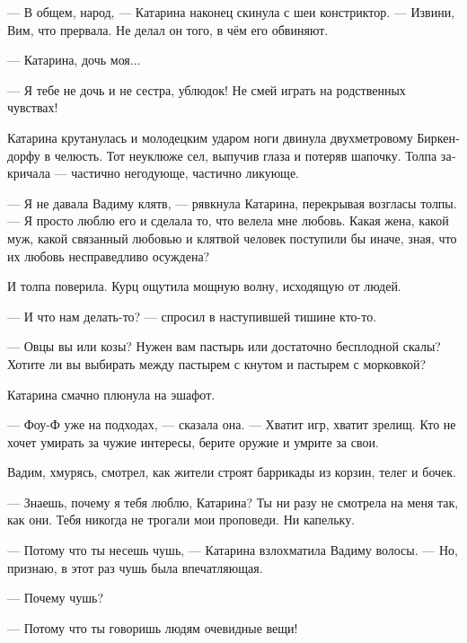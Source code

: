\documentclass[a4paper,12pt,fleqn]{book}\usepackage{polyglossia}\setdefaultlanguage[babelshorthands=true]{russian}\setotherlanguage{english}\defaultfontfeatures{Ligatures=TeX,Mapping=tex-text}\usepackage{xcolor}\newcommand{\ml}[3]{#2}
\newcommand{\textspace}{\vspace{1em}{\centering\Large\bfseries<...>\par}\vspace{1em}}
\begin{document}
--- В общем, народ, --- Катарина наконец скинула с шеи констриктор.
--- Извини, Вим, что прервала.
Не делал он того, в чём его обвиняют.

--- Катарина, дочь моя...

--- Я тебе не дочь и не сестра, ублюдок!
Не смей играть на родственных чувствах!

Катарина крутанулась и молодецким ударом ноги двинула двухметровому Биркендорфу в челюсть.
Тот неуклюже сел, выпучив глаза и потеряв шапочку.
Толпа закричала --- частично негодующе, частично ликующе.

--- Я не давала Вадиму клятв, --- рявкнула Катарина, перекрывая возгласы толпы.
--- Я просто люблю его и сделала то, что велела мне любовь.
Какая жена, какой муж, какой связанный любовью и клятвой человек поступили бы иначе, зная, что их любовь несправедливо осуждена?

И толпа поверила.
Курц ощутила мощную волну, исходящую от людей.

--- И что нам делать-то? --- спросил в наступившей тишине кто-то.

\ml{$0$}
{--- Овцы вы или козы?}
{``Are y'all lambs or goats?}
\ml{$0$}
{Нужен вам пастырь или достаточно бесплодной скалы?}
{Need y'all shepherds or barren rock is enough?}
\ml{$0$}
{Хотите ли вы выбирать между пастырем с кнутом и пастырем с морковкой?}
{Want you or not to choose between a stick shepherd and a carrot shepherd?''}

Катарина смачно плюнула на эшафот.

\ml{$0$}
{--- Фоу-Ф уже на подходах, --- сказала она.}
{``Foe-F are coming,'' she said.}
\ml{$0$}
{--- Хватит игр, хватит зрелищ.}
{``Enough of games, enough of shows.}
\ml{$0$}
{Кто не хочет умирать за чужие интересы, берите оружие и умрите за свои.}
{Anyone who is sick of dying for someone else, take a weapon and die for yourself.''}

\textspace

Вадим, хмурясь, смотрел, как жители строят баррикады из корзин, телег и бочек.

--- Знаешь, почему я тебя люблю, Катарина?
Ты ни разу не смотрела на меня так, как они.
Тебя никогда не трогали мои проповеди.
Ни капельку.

--- Потому что ты несешь чушь, --- Катарина взлохматила Вадиму волосы.
--- Но, признаю, в этот раз чушь была впечатляющая.

--- Почему чушь?

--- Потому что ты говоришь людям очевидные вещи!
\end{document}
